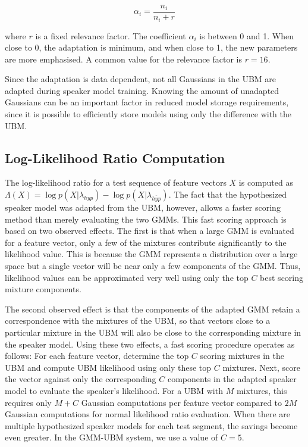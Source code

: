 \documentclass[a4paper,twocolumn]{article}
\begin{document}
\begin{equation}
    \label{eq:alpha_coeff}
    \alpha_i = \frac{n_i}{n_i + r}
\end{equation}

\noindent where $r$ is a fixed relevance factor. The coefficient $\alpha_i$ is between 0 and 1. When close to 0, the adaptation is minimum, and when close to 1, the new parameters are more emphasised. A common value for the relevance factor is $r = 16$.

Since the adaptation is data dependent, not all Gaussians in the UBM are adapted during speaker model training. Knowing the amount of unadapted Gaussians can be an important factor in reduced model storage requirements, since it is possible to efficiently store models using only the difference with the UBM.

\subsection{Log-Likelihood Ratio Computation}

The log-likelihood ratio for a test sequence of feature vectors $X$ is computed as $\Lambda(X) = \log p(X|\lambda_{hyp}) - \log p(X|\lambda_{\overline{hyp}})$. The fact that the hypothesized speaker model was adapted from the UBM, however, allows a faster scoring method than merely evaluating the two GMMs. This fast scoring approach is based on two observed effects. The first is that when a large GMM is evaluated for a feature vector, only a few of the mixtures contribute significantly to the likelihood value. This is because the GMM represents a distribution over a large space but a single vector will be near only a few components of the GMM. Thus, likelihood values can be approximated very well using only the top $C$ best scoring mixture components.

The second observed effect is that the components of the adapted GMM retain a correspondence with the mixtures of the UBM, so that vectors close to a particular mixture in the UBM will also be close to the corresponding mixture in the speaker model. Using these two effects, a fast scoring procedure operates as follows: For each feature vector, determine the top $C$ scoring mixtures in the UBM and compute UBM likelihood using only these top $C$ mixtures. Next, score the vector against only the corresponding $C$ components in the adapted speaker model to evaluate the speaker’s likelihood. For a UBM with $M$ mixtures, this requires only $M + C$ Gaussian computations per feature vector compared to $2M$ Gaussian computations for normal likelihood ratio evaluation. When there are multiple hypothesized speaker models for each test segment, the savings become even greater. In the GMM-UBM system, we use a value of $C = 5$.
\end{document}
